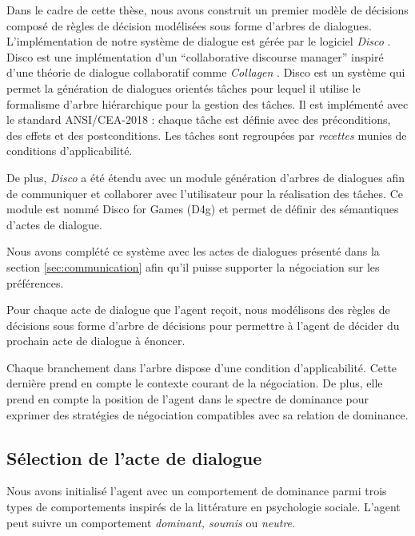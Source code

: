 Dans le cadre de cette thèse, nous avons construit un premier modèle de décisions composé de règles de décision modélisées sous forme d'arbres de dialogues. L'implémentation de notre système de dialogue est gérée par le logiciel \emph{Disco} \cite{rich09}. Disco est une implémentation d'un ``collaborative discourse manager'' inspiré d'une théorie de dialogue collaboratif comme \emph{Collagen} \cite{rich1997collagen}. Disco est un système qui permet la génération de dialogues orientés tâches pour lequel il utilise le formalisme d'arbre hiérarchique pour la gestion des tâches. Il est implémenté avec le standard ANSI/CEA-2018 : chaque tâche est définie avec des préconditions, des effets et des postconditions. Les tâches sont regroupées par \emph{recettes} munies de conditions d'applicabilité.

De plus, \emph{Disco} a été étendu avec un module génération d'arbres de dialogues afin de communiquer et collaborer avec l'utilisateur pour la réalisation des tâches. Ce module est nommé Disco for Games (D4g) et permet de définir des sémantiques d'actes de dialogue. 

Nous avons complété ce système avec les actes de dialogues présenté dans la section \ref{sec:communication} afin qu'il puisse supporter la négociation sur les préférences.

Pour chaque acte de dialogue que l'agent reçoit, nous modélisons des règles de décisions sous forme d'arbre de décisions pour permettre à l'agent de décider du prochain acte de dialogue à énoncer.

Chaque branchement dans l'arbre dispose d'une condition d'applicabilité. Cette dernière prend en compte le contexte courant de la négociation. De plus, elle prend en compte la position de l'agent dans le spectre de dominance pour exprimer des stratégies de négociation compatibles avec sa relation de dominance.



	
	
	\subsection{Sélection de l'acte de dialogue}
	Nous avons initialisé l'agent avec un comportement de dominance parmi trois types de comportements inspirés de la littérature en psychologie sociale.  L'agent peut suivre un comportement \emph{dominant, soumis} ou \emph{neutre}. 
	
